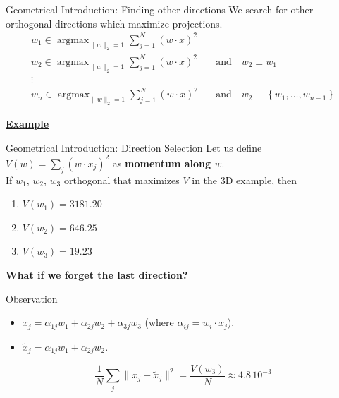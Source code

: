 \documentclass[10pt]{beamer}
\theoremstyle{definition}
\newcommand{\1}{\mathbbm{1}}
\DeclareMathOperator*{\argmax}{argmax}
\begin{document}
\begin{frame}{Geometrical Introduction: Finding other directions}
  We search for other orthogonal directions which maximize projections.
  \begin{equation*}
  \begin{aligned}
    w_1 \in \argmax_{\|w\|_2=1}\sum_{j=1}^N (w\cdot x)^2 &\\
    w_2 \in \argmax_{\|w\|_2=1}\sum_{j=1}^N (w\cdot x)^2 &\quad\mbox{and}\quad w_2\perp w_1\\
    \vdots \\
    w_n \in \argmax_{\|w\|_2=1}\sum_{j=1}^N (w\cdot x)^2 &\quad\mbox{and}\quad w_2\perp \left\{
    w_1,\ldots,w_{n-1} \right\}
  \end{aligned}
\end{equation*}
\begin{center}
  \href{./pic/PCA_3D.html}{\bf Example}
\end{center}
\end{frame}
\begin{frame}{Geometrical Introduction: Direction Selection}
Let us define $V(w)=\sum_j (w \cdot x_j)^2$ as {\bf momentum along $w$}. \\
  If $w_1,\,w_2,\,w_3$ orthogonal that maximizes $V$ in the 3D example, then
  \begin{enumerate}
    \item<1-> $V(w_1) =  3181.20$\hfill{}
    \item<2-> $V(w_2) = 646.25$\hfill{}
    \item<3-> $V(w_3) = 19.23$ \hfill{}
  \end{enumerate}
    \begin{center}
      {\bf What if we forget the last direction?}
    \end{center}
  \begin{block}{Observation}
    \begin{itemize}
        \item $x_j =\alpha_{1j}w_1+\alpha_{2j}w_2+\alpha_{3j}w_3$
          (where $\alpha_{ij} = w_i\cdot x_j$).
        \item $\tilde x_j = \alpha_{1j}w_1 + \alpha_{2j}w_2$. 
    \end{itemize}
    \begin{equation}
      \frac{1}{N}\sum_j \|x_j - \tilde x_j\|^2 = \frac{V(w_3)}{N}\approx
      4.8\,10^{-3}
      \tag{MSE}
    \end{equation}
  \end{block}
  
  
\end{frame}
\end{document}
